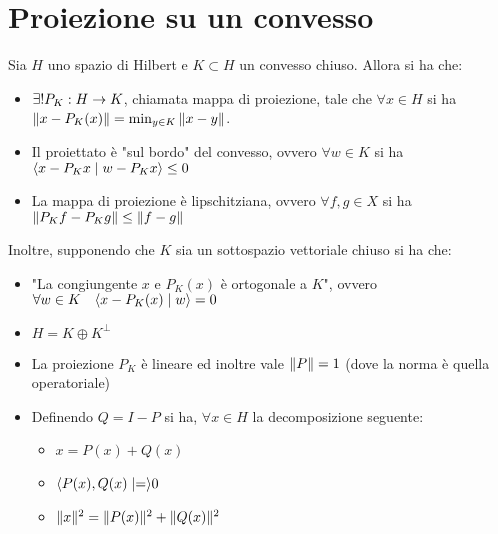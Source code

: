 \documentclass[a4paper,NoNotes,GeneralMath]{stdmdoc}
\begin{document}
	\section*{Proiezione su un convesso}
	Sia $H$ uno spazio di Hilbert e $K \subset H$ un convesso chiuso. Allora si ha che:
	\begin{itemize}
		\item $\exists ! P_K: H \rightarrow K$, chiamata mappa di proiezione, tale che $\forall x \in H$ si ha $\| {x - P_K(x)} \| = \min_{y \in K} \| {x - y} \|$.
		\item Il proiettato è "sul bordo" del convesso, ovvero $\forall w \in K$ si ha $\langle x - P_K x \mid w - P_K x \rangle \le 0$
		\item La mappa di proiezione è lipschitziana, ovvero $\forall f, g \in X$ si ha $\| {P_K f - P_K g} \| \le \| {f - g} \|$
	\end{itemize}
	Inoltre, supponendo che $K$ sia un sottospazio vettoriale chiuso si ha che:
	\begin{itemize}
		\item "La congiungente $x$ e $P_K(x)$ è ortogonale a $K$", ovvero $\forall w \in K \quad \langle x - P_K(x) \mid w \rangle = 0$
		\item $H = K \oplus K^\bot$
		\item La proiezione $P_K$ è lineare ed inoltre vale $\| {P} \| = 1$ (dove la norma è quella operatoriale)
		\item Definendo $Q = I - P$ si ha, $\forall x \in H$ la decomposizione seguente:
			\begin{itemize}
				\item $x = P(x) + Q(x)$
				\item $\langle P(x), Q(x) \mid = \rangle 0$
				\item $\| {x} \|^2 = \| {P(x)} \|^2 + \| {Q(x)} \|^2$
			\end{itemize}
	\end{itemize}
	
\end{document}
